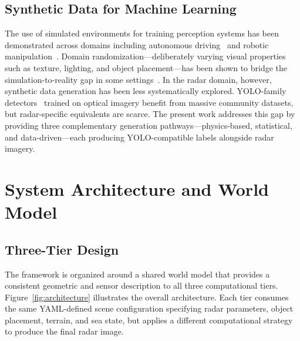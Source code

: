 \documentclass[conf]{new-aiaa}
\begin{document}
\subsection{Synthetic Data for Machine Learning}
The use of simulated environments for training perception systems has been demonstrated across domains including autonomous driving~\cite{Shah2018} and robotic manipulation~\cite{Tobin2017}. Domain randomization---deliberately varying visual properties such as texture, lighting, and object placement---has been shown to bridge the simulation-to-reality gap in some settings~\cite{Tremblay2018}. In the radar domain, however, synthetic data generation has been less systematically explored. YOLO-family detectors~\cite{Redmon2016, Jocher2023} trained on optical imagery benefit from massive community datasets, but radar-specific equivalents are scarce. The present work addresses this gap by providing three complementary generation pathways---physics-based, statistical, and data-driven---each producing YOLO-compatible labels alongside radar imagery.

\section{System Architecture and World Model}\label{sec:architecture}

\subsection{Three-Tier Design}
The framework is organized around a shared world model that provides a consistent geometric and sensor description to all three computational tiers. Figure~\ref{fig:architecture} illustrates the overall architecture. Each tier consumes the same YAML-defined scene configuration specifying radar parameters, object placement, terrain, and sea state, but applies a different computational strategy to produce the final radar image.
\end{document}
